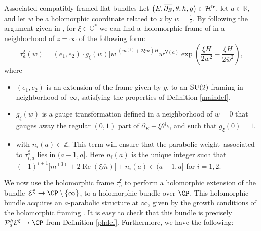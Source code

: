 \begin{subsubsection}{Associated compatibly framed flat bundles}
Let $\bigl(E,\overline{\partial_E},\theta,h,g\bigr)\in \mathcal{H}^{{\rm fr}}$, let $a\in \mathbb{R}$, and let $w$ be a holomorphic coordinate related to $z$ by $w=\frac{1}{z}$. By following the argument given in \cite[Sections 7 and 8]{BB04}, for $\xi \in \mathbb{C}^*$ we can find a~holomorphic frame  of  in a neighborhood of $z=\infty$ of the following form:
\begin{equation}\label{twistcompframe}
 \tau_a^{\xi}(w)=(e_1,e_2)\cdot g_{\xi}(w) |w|^{(m^{(3)}+2\xi \overline{m})H}w^{N(a)}\exp \left(\frac{\overline{\xi}H}{2w^2}-\frac{\xi H}{2\overline{w}^2}\right),
\end{equation}
where
\begin{itemize}\itemsep=0pt
 \item $(e_1,e_2)$ is an extension of the frame given by $g$, to an ${\rm SU}(2)$ framing in neighborhood of~$\infty$, satisfying the properties of Definition \ref{maindef}.
 \item $g_{\xi}(w)$ is a gauge transformation defined in a neighborhood of $w=0$ that gauges away the regular $(0,1)$ part of $\overline{\partial}_E+\xi \theta^{\dagger_h}$, and such that $g_{\xi}(0)=1$.
 \item {} with $n_i(a)\in \mathbb{Z}$. This term will ensure that the parabolic weight~associated to $\tau_{i,a}^{\xi}$ lies in $ (a-1,a]$. Here $n_i(a)$ is the unique integer such that $(-1)^{i+1}\bigl[m^{(3)}+2\operatorname{Re}(\xi\overline{m})\bigr] + n_i(a)\in (a-1,a]$ for $i=1,2$.
\end{itemize}

We now use the holomorphic frame $\tau_a^{\xi}$ to perform a holomorphic extension of the bundle~${\mathcal{E}^{\xi}\to \CP \setminus \{\infty\}}$, to a holomorphic bundle over $\CP$. This holomorphic bundle acquires an $a$-parabolic structure at $\infty$, given by the growth conditions of the holomorphic framing . It is easy to check that this bundle is precisely $\mathcal{P}_a^h\mathcal{E}^{\xi}\to \CP$ from Definition \ref{phdef}. Furthermore, we have the following:


\end{subsubsection}
